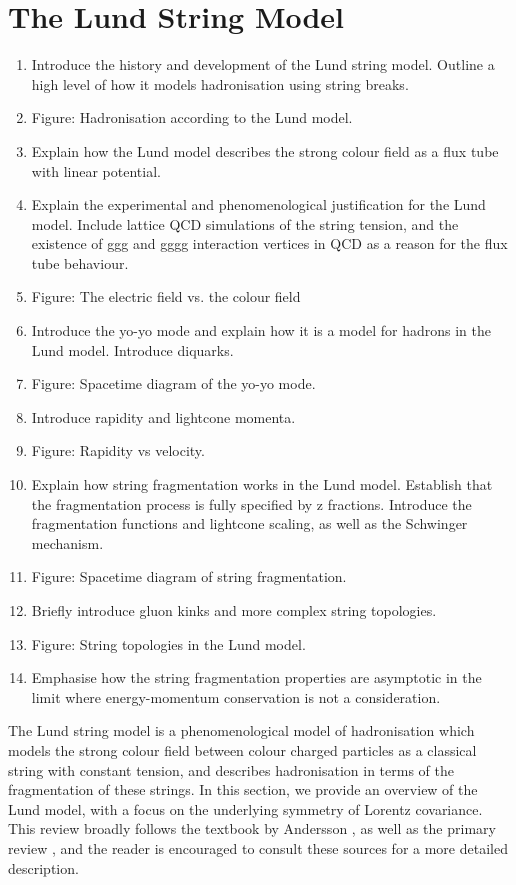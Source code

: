 \documentclass[12pt,a4paper]{report}
\begin{document}
\section{The Lund String Model}
\label{sec:lsm}
\begin{enumerate}
\item Introduce the history and development of the Lund string model. Outline a high level of how it models hadronisation using string breaks.
\item Figure: Hadronisation according to the Lund model.
\item Explain how the Lund model describes the strong colour field as a flux tube with linear potential.
\item Explain the experimental and phenomenological justification for the Lund model. Include lattice QCD simulations of the string tension, and the existence of ggg and gggg interaction vertices in QCD as a reason for the flux tube behaviour.
\item Figure: The electric field vs. the colour field
\item Introduce the yo-yo mode and explain how it is a model for hadrons in the Lund model. Introduce diquarks.
\item Figure: Spacetime diagram of the yo-yo mode.
\item Introduce rapidity and lightcone momenta.
\item Figure: Rapidity vs velocity.
\item Explain how string fragmentation works in the Lund model. Establish that the fragmentation process is fully specified by z fractions. Introduce the fragmentation functions and lightcone scaling, as well as the Schwinger mechanism.
\item Figure: Spacetime diagram of string fragmentation.
\item Briefly introduce gluon kinks and more complex string topologies.
\item Figure: String topologies in the Lund model.
\item Emphasise how the string fragmentation properties are asymptotic in the limit where energy-momentum conservation is not a consideration. 
\end{enumerate}

The Lund string model is a phenomenological model of hadronisation which models the strong colour field between colour charged particles as a classical string with constant tension, and describes hadronisation in terms of the fragmentation of these strings. In this section, we provide an overview of the Lund model, with a focus on the underlying symmetry of Lorentz covariance. This review broadly follows the textbook by Andersson \cite{Andersson:1997xwk}, as well as the primary review \cite{Andersson:1983ia}, and the reader is encouraged to consult these sources for a more detailed description.
\end{document}
